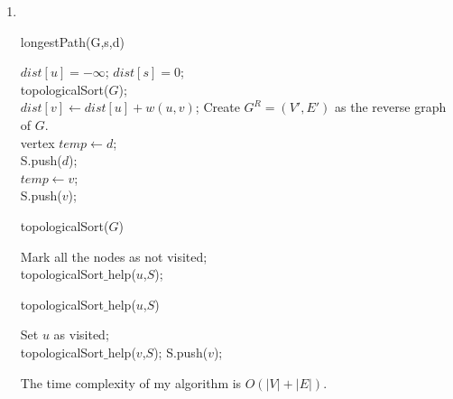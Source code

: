 \documentclass[12pt,a4paper]{article}
\makeatletter
\newtheorem*{solution}{Solution}
\theoremstyle{definition}
\renewenvironment{solution}[1][Solution] {\par\pushQED{\qed}\normalfont\topsep6\p@\@plus6\p@\relax\trivlist\item[\hskip\labelsep\bfseries#1\@addpunct{.}]\ignorespaces}{\popQED\endtrivlist\@endpefalse} \makeatother
\makeatother
\begin{document}
\begin{enumerate}
\begin{solution}
\ \\
\begin{minipage}[t]{0.47\textwidth}
\begin{algorithm}[H]
	\caption{longestPath(G,s,d)}
	{
		$dist[u]=-\infty$;
	}
	$dist[s]=0$;\\
	topologicalSort($G$);\\
	{
		{
			{
				$dist[v]\leftarrow dist[u]+w(u,v)$;
			} 
		}
	}
	Create $G^R=(V',E')$ as the reverse graph of $G$.\\
	vertex $temp\leftarrow d$;\\
	S.push($d$);\\
	{
		{
			{
				$temp\leftarrow v$;\\
				S.push($v$);
			}
		}
	}
\end{algorithm}
\end{minipage}
\hspace{2mm}
\begin{minipage}[t]{0.47\textwidth}
\begin{algorithm}[H]
	\caption{topologicalSort($G$)}
	Mark all the nodes as not visited;\\
	{
		{
			topologicalSort$\_$help($u$,$S$);
		}
	}
\end{algorithm}
\begin{algorithm}[H]
	\caption{topologicalSort$\_$help($u$,$S$)}
	Set $u$ as visited;\\
	{
		{
			topologicalSort$\_$help($v$,$S$);
		}
		S.push($v$);
	}
\end{algorithm}
The time complexity of my algorithm is $O(|V|+|E|)$.
\end{minipage}
\end{solution}


\end{enumerate}
\end{document}
